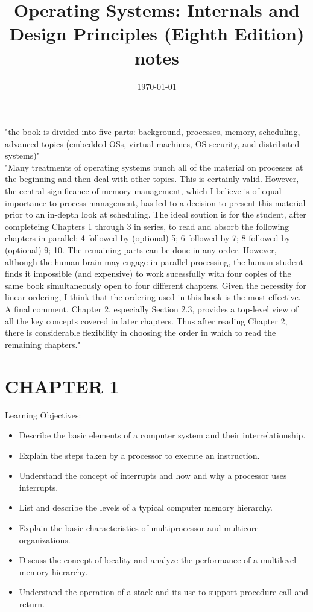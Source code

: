 \documentclass{article}
\title{Operating Systems: Internals and Design Principles (Eighth Edition) notes}
\date{\today}
\begin{document}
\maketitle

"the book is divided into five parts: background, processes, memory, scheduling, advanced topics (embedded OSs, virtual machines, OS security, and distributed systems)"\\

"Many treatments of operating systems bunch all of the material on processes at the beginning and then deal with other topics. This is certainly valid. However, the central significance of memory management, which I believe is of equal importance to process management, has led to a decision to present this material prior to an in-depth look at scheduling. The ideal soution is for the student, after completeing Chapters 1 through 3 in series, to read and absorb the following chapters in parallel: 4 followed by (optional) 5; 6 followed by 7; 8 followed by (optional) 9; 10. The remaining parts can be done in any order. However, although the human brain may engage in parallel processing, the human student finds it impossible (and expensive) to work sucessfully with four copies of the same book simultaneously open to four different chapters. Given the necessity for linear ordering, I think that the ordering used in this book is the most effective. A final comment. Chapter 2, especially Section 2.3, provides a top-level view of all the key concepts covered in later chapters. Thus after reading Chapter 2, there is considerable flexibility in choosing the order in which to read the remaining chapters."

\section*{CHAPTER 1}
	Learning Objectives:
	\begin{itemize}
		\item Describe the basic elements of a computer system and their interrelationship.
		\item Explain the steps taken by a processor to execute an instruction.
		\item Understand the concept of interrupts and how and why a processor uses interrupts.
		\item List and describe the levels of a typical computer memory hierarchy.
		\item Explain the basic characteristics of multiprocessor and multicore organizations.
		\item Discuss the concept of locality and analyze the performance of a multilevel memory hierarchy.
		\item Understand the operation of a stack and its use to support procedure call and return.
	\end{itemize}
\end{document}
